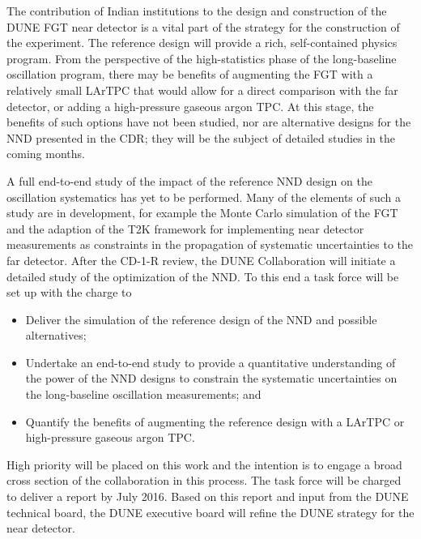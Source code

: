 The contribution of Indian institutions to the design and construction
of the DUNE FGT near detector is a vital part of the strategy for the
construction of the experiment. The reference design will provide a
rich, self-contained physics program. From the perspective of the
high-statistics phase of the long-baseline oscillation program, there
may be benefits of augmenting the FGT with a relatively small LArTPC
that would allow for a direct comparison with the far detector, or
adding a high-pressure gaseous argon TPC. At this stage, the benefits
of such options have not been studied, nor are alternative designs for
the NND presented in the CDR; they will be the subject of detailed
studies in the coming months.

A full end-to-end study of the impact of the reference NND 
design on the
oscillation systematics has yet to be performed. Many of the elements
of such a study are in development, for example the Monte Carlo
simulation of the FGT and the adaption of the T2K framework for
implementing near detector measurements as constraints in the propagation of
systematic uncertainties to the far detector.  After the CD-1-R review, the DUNE
Collaboration will initiate a detailed study of the optimization of
the NND. 
To this end a task force will be set up with the
charge to
\begin{itemize}
\item Deliver the simulation of the reference design of the NND and
  possible alternatives;
\item Undertake an end-to-end study to provide a quantitative
  understanding of the power of the NND designs to constrain the
  systematic uncertainties on the long-baseline oscillation measurements; and
\item Quantify the benefits of augmenting the reference design with
  a LArTPC or high-pressure gaseous argon TPC.
\end{itemize}
High priority will be placed on this work and the intention is to
engage a broad cross section of the collaboration in this process. The
task force will be charged to deliver a report by July 2016. Based on
this report and input from the DUNE technical board,
the DUNE executive board will refine the DUNE strategy for the near
detector. 
